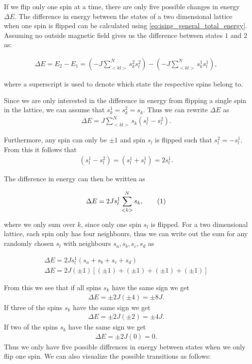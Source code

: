 \documentclass[reprint,english,notitlepage]{revtex4-1}  %
\newcommand\numberthis{\addtocounter{equation}{1}\tag{\theequation}}
\begin{document}
If we flip only one spin at a time, there are only five possible changes in energy $\Delta E$. The difference in energy between the states of a two dimensional lattice when one spin is flipped can be calculated using \eqref{eq:ising_general_total_energy}. Assuming no outside magnetic field gives us the difference between states \(1\) and \(2\) as:

\begin{align*}
	\Delta E = E_{2} - E_{1} = \left(-J \sum\limits_{<kl>}^N s_k^{2} s_l^{2}\right) -
	\left(-J \sum\limits_{<kl>}^N s_k^{1} s_l^{1}\right),
\end{align*}

where a superscript is used to denote which state the respective spins belong to.

Since we are only interested in the difference in energy from flipping a single spin in the lattice, we can assume that \(s_{k}^{1} = s_{k}^{2} = s_{k}\). Thus we can rewrite \(\Delta E\) as
\begin{align*}
 	\Delta E = J \sum_{<kl>}^{N} s_{k} \left(s_{l}^{1} - s_{l}^{2}\right).
\end{align*}

Furthermore, any spin can only be \(\pm 1\) and spin \(s_{l}\) is flipped such that \(s_{l}^{2} = -s_{l}^{1}\). From this it follows that \begin{align*}
	\left(s_{l}^{1} - s_{l}^{2}\right) = \left(s_{l}^{1} + s_{l}^{1}\right) = 2s_{l}^{1}.
\end{align*}

The difference in energy can then be written as

\begin{align*}
 	\Delta E = 2Js_{l}^{1} \sum_{<k>}^{N} s_{k}, \numberthis \label{eq:delta_e}
\end{align*}

where we only sum over \(k\), since only one spin \(s_{l}\) is flipped.
For a two dimensional lattice, each spin only has four neighbours, thus we can write out the sum for any randomly chosen \(s_{l}\) with neighbours \(s_{a}, s_{b}, s_{c}, s_{d}\) as

\begin{align*}
	\Delta E = 2Js_{l}^{1}\left(s_{a} + s_{b} + s_{c} + s_{d}\right) \\
	\Delta E = 2J(\pm 1)\left[(\pm 1) + (\pm 1) + (\pm 1) + (\pm 1)\right]
\end{align*}

From this we see that if all spins \(s_{k}\) have the same sign we get
\begin{align*}
	\Delta E = \pm 2J(\pm 4) = \pm 8J.
\end{align*}
If three of the spins \(s_{k}\) have the same sign we get
\begin{align*}
	\Delta E = \pm 2J(\pm 2) = \pm 4J.
\end{align*}
If two of the spins \(s_{k}\) have the same sign we get
\begin{align*}
	\Delta E = \pm 2J(0) = 0.
\end{align*}
Thus we only have five possible diffrences in energy between states when we only flip one spin. We can also visualize the possible transitions as follows:
\end{document}
